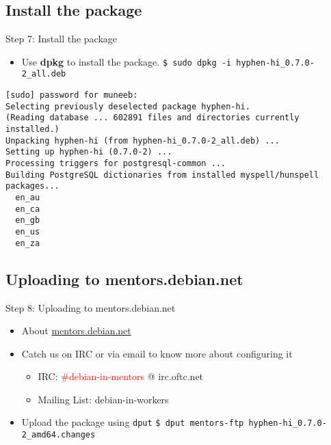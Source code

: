 \documentclass[red,10pt,a4paper]{beamer}
\begin{document}
\subsection{Install the package}

\begin{frame}[fragile]{Step 7: Install the package}
  \hbr
 \begin{itemize}
  \item Use \textbf{dpkg} to install the package.
  \lstinline|$ sudo dpkg -i hyphen-hi_0.7.0-2_all.deb |

 \end{itemize}
   \begin{lstlisting}[basicstyle=\fontsize{8pt}{10}\ttfamily]
[sudo] password for muneeb: 
Selecting previously deselected package hyphen-hi.
(Reading database ... 602891 files and directories currently installed.)
Unpacking hyphen-hi (from hyphen-hi_0.7.0-2_all.deb) ...
Setting up hyphen-hi (0.7.0-2) ...
Processing triggers for postgresql-common ...
Building PostgreSQL dictionaries from installed myspell/hunspell packages...
  en_au
  en_ca
  en_gb
  en_us
  en_za

  \end{lstlisting}

\end{frame}

\subsection{Uploading to mentors.debian.net}

\begin{frame}[fragile]{Step 8: Uploading to mentors.debian.net}
 \hbr
  \begin{itemize}
    \item About \url{mentors.debian.net}
    \item Catch us on IRC or via email to know more about configuring it
    \begin{itemize}
     \item IRC: \textcolor{red}{\#debian-in-mentors} @ irc.oftc.net
     \item Mailing List: debian-in-workers
    \end{itemize}
  
  \item Upload the package using \texttt{dput}
  \lstinline|$ dput mentors-ftp hyphen-hi_0.7.0-2_amd64.changes|
  \end{itemize}

\end{frame}
\end{document}
